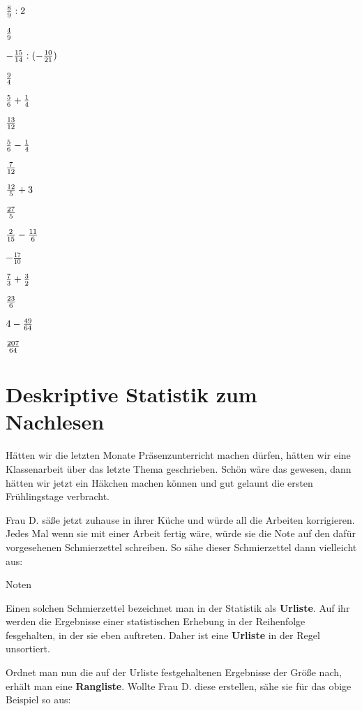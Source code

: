 \documentclass[
  ngerman,
]{book}
\begin{document}
\({8 \over 9}:2\)

\leavevmode\hypertarget{toggleText21}{}%
\(4 \over 9\)

\(-{15 \over 14}:(-{10 \over 21})\)

\leavevmode\hypertarget{toggleText22}{}%
\(9 \over 4\)

\({5 \over 6}+{1 \over 4}\)

\leavevmode\hypertarget{toggleText23}{}%
\(13 \over 12\)

\({5 \over 6}-{1 \over 4}\)

\leavevmode\hypertarget{toggleText24}{}%
\(7 \over 12\)

\({12 \over 5}+3\)

\leavevmode\hypertarget{toggleText25}{}%
\(27 \over 5\)

\({2 \over 15}-{11 \over 6}\)

\leavevmode\hypertarget{toggleText26}{}%
\(-{\frac{17}{10}}\)

\({7 \over 3}+{3 \over 2}\)

\leavevmode\hypertarget{toggleText27}{}%
\(23 \over 6\)

\(4-{49 \over 64}\)

\leavevmode\hypertarget{toggleText28}{}%
\(207 \over 64\)

\hypertarget{deskriptive-statistik-zum-nachlesen}{%
\section{Deskriptive Statistik zum Nachlesen}\label{deskriptive-statistik-zum-nachlesen}}

Hätten wir die letzten Monate Präsenzunterricht machen dürfen, hätten wir eine Klassenarbeit über das letzte Thema geschrieben. Schön wäre das gewesen, dann hätten wir jetzt ein Häkchen machen können und gut gelaunt die ersten Frühlingstage verbracht.

Frau D. säße jetzt zuhause in ihrer Küche und würde all die Arbeiten korrigieren. Jedes Mal wenn sie mit einer Arbeit fertig wäre, würde sie die Note auf den dafür vorgesehenen Schmierzettel schreiben. So sähe dieser Schmierzettel dann vielleicht aus:

Noten

Einen solchen Schmierzettel bezeichnet man in der Statistik als \textbf{Urliste}. Auf ihr werden die Ergebnisse einer statistischen Erhebung in der Reihenfolge fesgehalten, in der sie eben auftreten. Daher ist eine \textbf{Urliste} in der Regel unsortiert.

Ordnet man nun die auf der Urliste festgehaltenen Ergebnisse der Größe nach, erhält man eine \textbf{Rangliste}. Wollte Frau D. diese erstellen, sähe sie für das obige Beispiel so aus:
\end{document}
